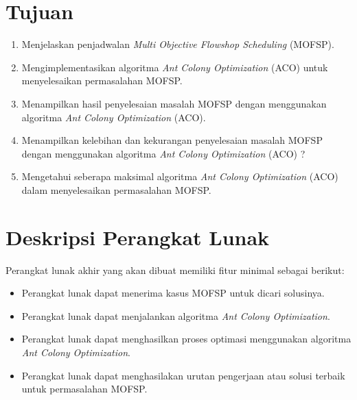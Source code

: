 \documentclass[a4paper,twoside]{article}
\begin{document}
\section{Tujuan}
\begin{enumerate}[label=(\alph*)]
	\item Menjelaskan penjadwalan {\it Multi Objective Flowshop Scheduling} (MOFSP).
	\item Mengimplementasikan algoritma {\it Ant Colony Optimization} (ACO) untuk menyelesaikan permasalahan MOFSP.
	\item Menampilkan hasil penyelesaian masalah MOFSP dengan menggunakan algoritma {\it Ant Colony Optimization} (ACO).
	\item Menampilkan kelebihan dan kekurangan penyelesaian masalah MOFSP dengan menggunakan algoritma {\it Ant Colony Optimization} (ACO) ?
	\item Mengetahui seberapa maksimal algoritma {\it Ant Colony Optimization} (ACO) dalam menyelesaikan permasalahan MOFSP.
	
\end{enumerate}


\section{Deskripsi Perangkat Lunak}
Perangkat lunak akhir yang akan dibuat memiliki fitur minimal sebagai berikut:
\begin{itemize}
	\item Perangkat lunak dapat menerima kasus MOFSP untuk dicari solusinya.
	\item Perangkat lunak dapat menjalankan algoritma {\it Ant Colony Optimization}.
	\item Perangkat lunak dapat menghasilkan proses optimasi menggunakan algoritma {\it Ant Colony Optimization}.
	\item Perangkat lunak dapat menghasilakan urutan pengerjaan atau solusi terbaik untuk permasalahan MOFSP.
	
\end{itemize}
\end{document}

